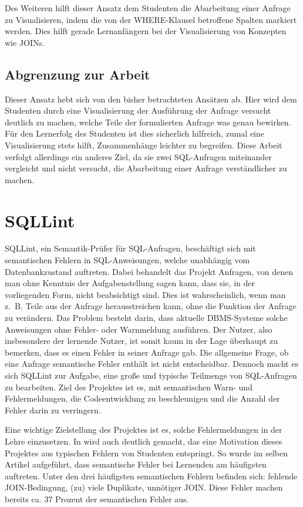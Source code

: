 Des Weiteren hilft dieser Ansatz dem Studenten die Abarbeitung einer Anfrage zu Visualisieren, indem die von der WHERE-Klausel betroffene Spalten markiert werden. Dies hilft gerade Lernanfängern bei der Visualisierung von Konzepten wie JOINs.

\subsection*{Abgrenzung zur Arbeit}

Dieser Ansatz hebt sich von den bisher betrachteten Ansätzen ab. Hier wird dem Studenten durch eine Visualisierung der Ausführung der Anfrage versucht deutlich zu machen, welche Teile der formulierten Anfrage was genau bewirken. Für den Lernerfolg des Studenten ist dies sicherlich hilfreich, zumal eine Visualisierung stets hilft, Zusammenhänge leichter zu begreifen. Diese Arbeit verfolgt allerdings ein anderes Ziel, da sie zwei SQL-Anfragen miteinander vergleicht und nicht versucht, die Abarbeitung einer Anfrage verständlicher zu machen.

\section{SQLLint}

SQLLint, ein Semantik-Prüfer für SQL-Anfragen, beschäftigt sich mit semantischen Fehlern in SQL-Anweisungen, welche unabhängig vom Datenbankzustand auftreten. Dabei behandelt das Projekt Anfragen, von denen man ohne Kenntnis der Aufgabenstellung sagen kann, dass sie, in der vorliegenden Form, nicht beabsichtigt sind. Dies ist wahrscheinlich, wenn man \mbox{z. B.} Teile aus der Anfrage herausstreichen kann, ohne die Funktion der Anfrage zu verändern.  Das Problem besteht darin, dass aktuelle DBMS-Systeme solche Anweisungen ohne Fehler- oder Warnmeldung ausführen. Der Nutzer, also insbesondere der lernende Nutzer, ist somit kaum in der Lage überhaupt zu bemerken, dass es einen Fehler in seiner Anfrage gab. Die allgemeine Frage, ob eine Anfrage semantische Fehler enthält ist nicht entscheidbar. Dennoch macht es sich SQLLint zur Aufgabe, eine große und typische Teilmenge von SQL-Anfragen zu bearbeiten. Ziel des Projektes ist es, mit semantischen Warn- und Fehlermeldungen, die Codeentwicklung zu beschleunigen und die Anzahl der Fehler darin zu verringern.

Eine wichtige Zielstellung des Projektes ist es, solche Fehlermeldungen in der Lehre einzusetzen. In \cite{sqllint1} wird auch deutlich gemacht, das eine Motivation dieses Projektes aus typischen Fehlern von Studenten entspringt. So wurde im selben Artikel aufgeführt, dass semantische Fehler bei Lernenden am häufigsten auftreten. Unter den drei häufigsten semantischen Fehlern befinden sich: fehlende JOIN-Bedingung, (zu) viele Duplikate, unnötiger JOIN. Diese Fehler machen bereits ca. 37 Prozent der semantischen Fehler aus.

